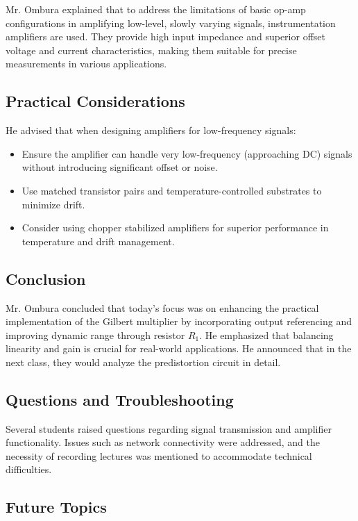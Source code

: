 Mr. Ombura explained that to address the limitations of basic op-amp configurations in amplifying low-level, slowly varying signals, instrumentation amplifiers are used. They provide high input impedance and superior offset voltage and current characteristics, making them suitable for precise measurements in various applications.

\subsection{Practical Considerations}

He advised that when designing amplifiers for low-frequency signals:

\begin{itemize}
    \item Ensure the amplifier can handle very low-frequency (approaching DC) signals without introducing significant offset or noise.
    \item Use matched transistor pairs and temperature-controlled substrates to minimize drift.
    \item Consider using chopper stabilized amplifiers for superior performance in temperature and drift management.
\end{itemize}

\subsection{Conclusion}

Mr. Ombura concluded that today's focus was on enhancing the practical implementation of the Gilbert multiplier by incorporating output referencing and improving dynamic range through resistor $R_1$. He emphasized that balancing linearity and gain is crucial for real-world applications. He announced that in the next class, they would analyze the predistortion circuit in detail.

\subsection{Questions and Troubleshooting}

Several students raised questions regarding signal transmission and amplifier functionality. Issues such as network connectivity were addressed, and the necessity of recording lectures was mentioned to accommodate technical difficulties. 

\subsection{Future Topics}

